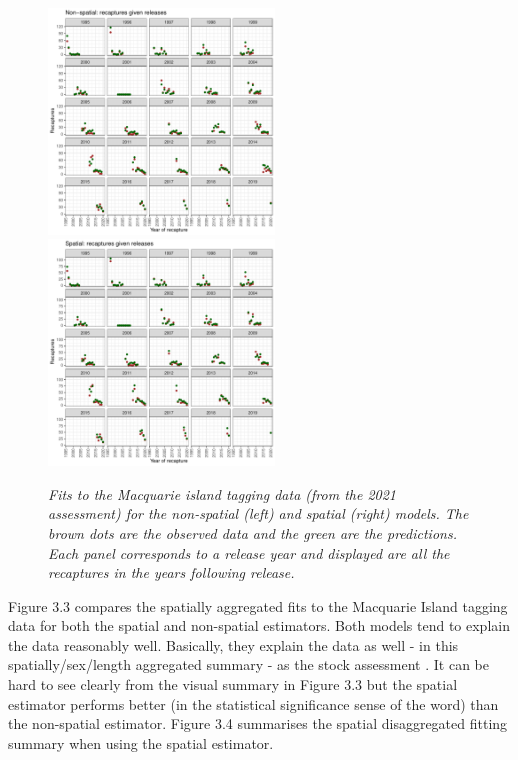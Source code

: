 \documentclass[12pt,a4paper,twoside,times,sky,standard]{csiroreport2017}
\begin{document}
\begin{figure}[hb]
    \begin{center}
        \includegraphics[width=6cm,height=6cm]{figs/nonspfits_macca.pdf}\includegraphics[width=6cm,height=6cm]{figs/spfits_macca.pdf}
    \end{center}
    \caption{\textit{Fits to the Macquarie island tagging data (from the 2021 assessment) for the non-spatial (left) and spatial (right) models. The brown dots are the observed data and the green are the predictions. Each panel corresponds to a release year and displayed are all the recaptures in the years following release.}}
\end{figure}

Figure 3.3 compares the spatially aggregated fits to the Macquarie Island tagging data for both the spatial and non-spatial estimators. Both models tend to explain the data reasonably well. Basically, they explain the data as well - in this spatially/sex/length aggregated summary - as the stock assessment \cite{misa}. It can be hard to see clearly from the visual summary in Figure 3.3 but the spatial estimator performs better (in the statistical significance sense of the word) than the non-spatial estimator. Figure 3.4 summarises the spatial disaggregated fitting summary when using the spatial estimator. 
\end{document}
